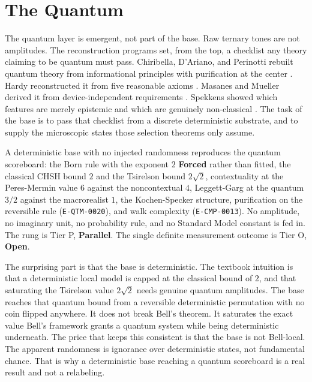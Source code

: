 \section{The Quantum}

The quantum layer is emergent, not part of the base. Raw ternary tones are not amplitudes.
The reconstruction programs set, from the top, a checklist any theory claiming to
be quantum must pass. Chiribella, D'Ariano, and Perinotti rebuilt quantum theory
from informational principles with purification at the center
\cite{chiribella2011, dariano2014}. Hardy reconstructed it from five reasonable
axioms \cite{hardy2001}. Masanes and Mueller derived it from device-independent
requirements \cite{masanes2011}. Spekkens showed which features are merely
epistemic and which are genuinely non-classical \cite{spekkens2007}. The task of
the base is to pass that checklist from a discrete deterministic substrate, and
to supply the microscopic states those selection theorems only assume.

\begin{finding}
A deterministic base with no injected randomness reproduces the quantum
scoreboard: the Born rule with the exponent $2$ \textbf{Forced} rather than
fitted, the classical CHSH bound $2$ and the Tsirelson bound $2\sqrt{2}$,
contextuality at the Peres-Mermin value $6$ against the noncontextual $4$,
Leggett-Garg at the quantum $3/2$ against the macrorealist $1$, the
Kochen-Specker structure, purification on the reversible rule (\texttt{E-QTM-0020}), and
walk complexity (\texttt{E-CMP-0013}). No amplitude, no imaginary unit, no probability
rule, and no Standard Model constant is fed in. The rung is Tier P,
\textbf{Parallel}. The single definite measurement outcome is Tier O,
\textbf{Open}.
\end{finding}

The surprising part is that the base is deterministic. The textbook intuition is that a deterministic
local model is capped at the classical bound of $2$, and that saturating the
Tsirelson value $2\sqrt{2}$ needs genuine quantum amplitudes. The base reaches
that quantum bound from a reversible deterministic permutation with no coin
flipped anywhere. It does not break Bell's theorem. It saturates the exact value
Bell's framework grants a quantum system while being deterministic underneath.
The price that keeps this consistent is that the base is not Bell-local. The
apparent randomness is ignorance over deterministic states, not fundamental
chance. That is why a deterministic base reaching a quantum scoreboard is a real
result and not a relabeling.

